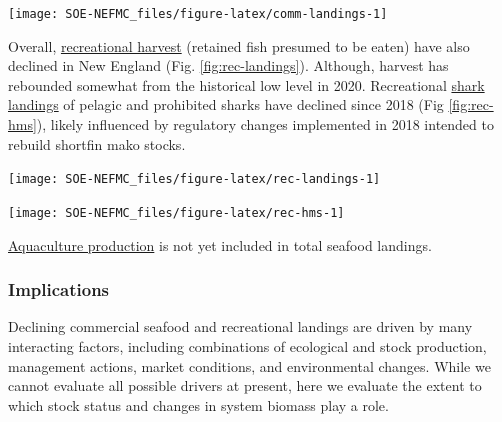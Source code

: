 \documentclass[
  10pt,
]{article}
\let\origfigure\figure
\let\endorigfigure\endfigure
\renewenvironment{figure}[1][2] {
    \expandafter\origfigure\expandafter[H]
} {
    \endorigfigure
}
\begin{document}
\begin{figure}

{\centering \texttt{[image: SOE-NEFMC\_files/figure-latex/comm-landings-1]} 

}

\caption{Total commercial landings (black) and NEFMC managed U.S seafood landings (red) by feeding guild for the Gulf of Maine (GOM, right) and Georges Bank (GB, left).}\label{fig:comm-landings}
\end{figure}

Overall, \href{https://noaa-edab.github.io/catalog/recreational-fishing-indicators.html}{recreational harvest} (retained fish presumed to be eaten) have also declined in New England (Fig. \ref{fig:rec-landings}). Although, harvest has rebounded somewhat from the historical low level in 2020. Recreational \href{https://noaa-edab.github.io/catalog/rec_hms.html}{shark landings} of pelagic and prohibited sharks have declined since 2018 (Fig \ref{fig:rec-hms}), likely influenced by regulatory changes implemented in 2018 intended to rebuild shortfin mako stocks.

\begin{figure}

{\centering \texttt{[image: SOE-NEFMC\_files/figure-latex/rec-landings-1]} 

}

\caption{Total recreational seafood harvest (millions of pounds) in the New England region.}\label{fig:rec-landings}
\end{figure}
\begin{figure}

{\centering \texttt{[image: SOE-NEFMC\_files/figure-latex/rec-hms-1]} 

}

\caption{Recreational shark landings from Large Pelagics Survey.}\label{fig:rec-hms}
\end{figure}

\href{https://noaa-edab.github.io/catalog/aquaculture-production.html}{Aquaculture production} is not yet included in total seafood landings.

\hypertarget{implications}{%
\subsubsection{Implications}\label{implications}}

Declining commercial seafood and recreational landings are driven by many interacting factors, including combinations of ecological and stock production, management actions, market conditions, and environmental changes. While we cannot evaluate all possible drivers at present, here we evaluate the extent to which stock status and changes in system biomass play a role.
\end{document}
